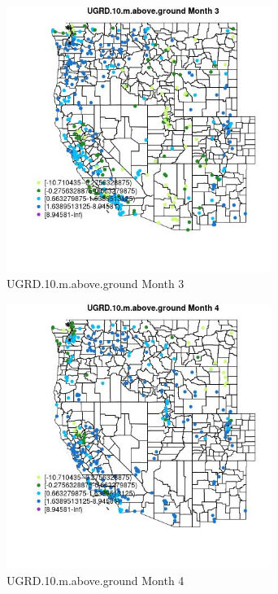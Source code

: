 \begin{figure} 
\centering  
\includegraphics[width=0.77\textwidth]{Code_Outputs/Report_ML_input_PM25_Step4_part_e_de_duplicated_aves_compiled_2019-05-18wNAs_MapObsMo3UGRD10maboveground.jpg} 
\caption{\label{fig:Report_ML_input_PM25_Step4_part_e_de_duplicated_aves_compiled_2019-05-18wNAsMapObsMo3UGRD10maboveground}UGRD.10.m.above.ground Month 3} 
\end{figure} 
 

\begin{figure} 
\centering  
\includegraphics[width=0.77\textwidth]{Code_Outputs/Report_ML_input_PM25_Step4_part_e_de_duplicated_aves_compiled_2019-05-18wNAs_MapObsMo4UGRD10maboveground.jpg} 
\caption{\label{fig:Report_ML_input_PM25_Step4_part_e_de_duplicated_aves_compiled_2019-05-18wNAsMapObsMo4UGRD10maboveground}UGRD.10.m.above.ground Month 4} 
\end{figure} 
 

